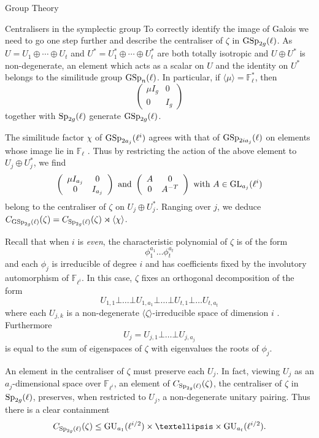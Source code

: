 \documentclass[11pt,a4paper]{article}
\newcommand{\Fl}{\mathbb{F}_\ell}
\newcommand{\Fli}{\mathbb{F}_{\ell^i}}
\begin{document}
\begin{section}{Group Theory}
\begin{subsection}{Centralisers in the symplectic group}
To correctly identify the image of Galois we need to go one step further and describe the centraliser of $\zeta$ in $\GSp_{2g}(\ell)$.
 As $U= U_1\oplus \cdots \oplus U_t$ and $U^* = U_1^*\oplus \cdots \oplus U_t^*$ are both totally isotropic and $U\oplus U^*$ is non-degenerate, an element which acts as a scalar on $U$ and the identity on $U^*$ belongs to the similitude group $\GSp_{n}(\ell)$. In particular, if $\langle\mu\rangle = \Fl^*$, then 
$$ \left(\begin{array}{cc}
    \mu I_{g} & 0 \\
    0 & I_{g}
\end{array}\right)$$
together with $\Sp_{2g}(\ell)$ generate $\GSp_{2g}(\ell)$.

The similitude factor $\chi$ of  $\GSp_{2a_j}(\ell^i)$ agrees with that of $\GSp_{2ia_j}(\ell)$ on elements whose image lie in $\Fl$ \cite[Lemma 4.3.5]{KleidmanLiebeck}. 
Thus by restricting the action of the above element to $U_j\oplus U_j^*$, we find
$$  \left(\begin{array}{cc}
    \mu I_{a_j} & 0 \\
    0 & I_{a_j}
\end{array}\right)
\text{ and }
\left(\begin{array}{cc}
    A & 0 \\
    0 & A^{-T}
\end{array}\right) \text{ with } A \in \GL_{a_j}(\ell^i)$$
belong to the centraliser of $\zeta$ on $U_j\oplus U_j^*$.
Ranging over $j$, we deduce $C_{\GSp_{2g}(\ell)}(\zeta) = C_{\Sp_{2g}(\ell)}(\zeta)\rtimes \langle \chi \rangle$.



Recall that when $i$ is \emph{even}, the characteristic polynomial of $\zeta$ is of the form
$$ \phi_1^{a_1}\ldots \phi_t^{a_t}$$
and each $\phi_j$ is irreducible of degree $i$ and has coefficients fixed by the involutory automorphism of $\Fli$.
In this case, $\zeta$ fixes an orthogonal decomposition of the form $$U_{1,1} \bot \ldots \bot U_{1,a_1} \bot \ldots \bot U_{t,1}\bot \ldots U_{t,a_t}$$
where each $ U_{j,k}$ is a non-degenerate $\langle \zeta \rangle$-irreducible space of dimension $i$ \cite[Prop. 3.4.3]{Burness}. Furthermore $$U_j = U_{j,1} \bot \ldots \bot U_{j,a_j} $$ is equal to the sum of eigenspaces of $\zeta$ with eigenvalues the roots of $\phi_j$.

An element in the centraliser of $\zeta$ must preserve each $U_j$. In fact, viewing $U_j$ as an $a_j$-dimensional space over $\Fli$, an element of $C_{\Sp_{2g}(\ell)}(\zeta)$, the centraliser of $\zeta$ in $\Sp_{2g}(\ell)$, preserves, when restricted to $U_j$, a non-degenerate unitary pairing.
Thus there is a clear containment \[C_{\Sp_{2g}(\ell)}(\zeta) \leq \GU_{a_1}(\ell^{i/2})\times \ldots \times \GU_{a_t}(\ell^{i/2}).\] 


\end{subsection}
\end{section}
\end{document}
